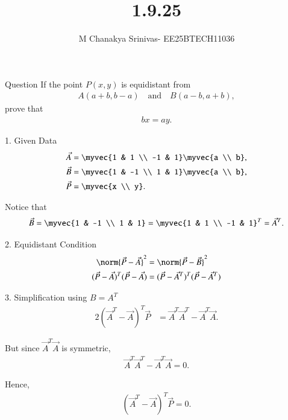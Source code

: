 \documentclass{beamer}
\title %
{1.9.25}
\date{}
\author %
{M Chanakya Srinivas- EE25BTECH11036}
\begin{document}
\frame{\titlepage}









\begin{frame}{Question}
If the point $P(x,y)$ is equidistant from 
\begin{align*}
A(a+b, b-a) \quad \text{and} \quad B(a-b, a+b),
\end{align*}
prove that 
\begin{align*}
bx = ay.
\end{align*}
\end{frame}

\begin{frame}{1. Given Data}
\begin{align}
\vec{A} &= \myvec{1 & 1 \\ -1 & 1}\myvec{a \\ b}, \\
\vec{B} &= \myvec{1 & -1 \\ 1 & 1}\myvec{a \\ b}, \\
\vec{P} &= \myvec{x \\ y}.
\end{align}

Notice that
\begin{align}
\vec{B} 
= \myvec{1 & -1 \\ 1 & 1} 
= \myvec{1 & 1 \\ -1 & 1}^T 
= \vec{A}^T.
\end{align}
\end{frame}

\begin{frame}{2. Equidistant Condition}
\begin{align}
\norm{\vec{P}-\vec{A}}^2 &= \norm{\vec{P}-\vec{B}}^2 \\
(\vec{P}-\vec{A})^T(\vec{P}-\vec{A}) &= (\vec{P}-\vec{A}^T)^T(\vec{P}-\vec{A}^T)
\end{align}
\end{frame}

\begin{frame}{3. Simplification using $B=A^T$}
\begin{align}
2(\vec{A}^T - \vec{A})^T \vec{P} &= \vec{A}^{T}\vec{A}^{T} - \vec{A}^T\vec{A}.
\end{align}

But since $\vec{A}^T\vec{A}$ is symmetric,
\begin{align*}
\vec{A}^{T}\vec{A}^{T} - \vec{A}^T\vec{A} = 0.
\end{align*}

Hence,
\begin{align*}
(\vec{A}^T - \vec{A})^T \vec{P} = 0.
\end{align*}
\end{frame}
\end{document}
